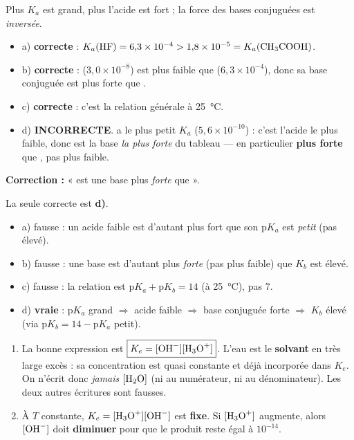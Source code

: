 \documentclass[11pt,a4paper]{article}
\begin{document}
\begin{corrige}
Plus $K_a$ est grand, plus l'acide est fort ; la force des bases conjuguées est \emph{inversée}.
\begin{itemize}[leftmargin=1.4em,topsep=2pt,itemsep=1.5pt]
  \item a) \textbf{correcte} : $K_a(\ce{HF}) = 6{,}3\times10^{-4} > 1{,}8\times10^{-5} = K_a(\ce{CH3COOH})$.
  \item b) \textbf{correcte} :  ($3{,}0\times10^{-8}$) est plus faible que  ($6{,}3\times10^{-4}$),
        donc sa base conjuguée  est plus forte que .
  \item c) \textbf{correcte} : c'est la relation générale à \qty{25}{\celsius}.
  \item d) \textbf{INCORRECTE}.  a le plus petit $K_a$ ($5{,}6\times10^{-10}$) : c'est l'acide le plus
        faible, donc  est la base \emph{la plus forte} du tableau — en particulier \textbf{plus forte}
        que , pas plus faible.
\end{itemize}
\textbf{Correction :} «  est une base plus \emph{forte} que  ».
\end{corrige}

\begin{corrige}
La seule correcte est \textbf{d)}.
\begin{itemize}[leftmargin=1.4em,topsep=2pt,itemsep=1.5pt]
  \item a) fausse : un acide faible est d'autant plus fort que son $\mathrm{p}K_a$ est \emph{petit} (pas élevé).
  \item b) fausse : une base est d'autant plus \emph{forte} (pas plus faible) que $K_b$ est élevé.
  \item c) fausse : la relation est $\mathrm{p}K_a + \mathrm{p}K_b = 14$ (à \qty{25}{\celsius}), pas $7$.
  \item d) \textbf{vraie} : $\mathrm{p}K_a$ grand $\Rightarrow$ acide faible $\Rightarrow$ base conjuguée forte
        $\Rightarrow$ $K_b$ élevé (via $\mathrm{p}K_b = 14 - \mathrm{p}K_a$ petit).
\end{itemize}
\end{corrige}

\begin{corrige}
\begin{enumerate}[label=\alph*)]
  \item La bonne expression est $\boxed{K_e = [\ce{OH-}][\ce{H3O+}]}$. L'eau est le \textbf{solvant} en très
        large excès : sa concentration est quasi constante et déjà incorporée dans $K_e$. On n'écrit donc
        \emph{jamais} $[\ce{H2O}]$ (ni au numérateur, ni au dénominateur). Les deux autres écritures sont fausses.
  \item À $T$ constante, $K_e = [\ce{H3O+}][\ce{OH-}]$ est \textbf{fixe}. Si $[\ce{H3O+}]$ augmente, alors
        $[\ce{OH-}]$ doit \textbf{diminuer} pour que le produit reste égal à $10^{-14}$.
\end{enumerate}
\end{corrige}
\end{document}
